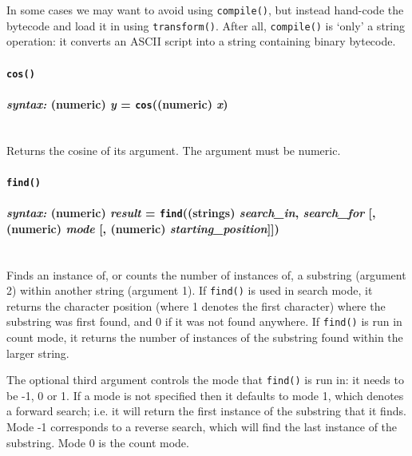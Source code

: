 \documentclass{article}
\begin{document}
In some cases we may want to avoid using \verb#compile()#, but instead hand-code the bytecode and load it in using \verb#transform()#.  After all, \texttt{compile()} is `only' a string operation:  it converts an ASCII script into a string containing binary bytecode.\\

 





\paragraph{\texttt{cos()}\\\\
\normalfont \emph{syntax: } (numeric) \emph{y} = \texttt{cos}((numeric) \emph{x})\\\\}

Returns the cosine of its argument.  The argument must be numeric.\\

 





\paragraph{\texttt{find()}\\\\
\normalfont \emph{syntax: } (numeric) \emph{result} = \texttt{find}((strings) \emph{search\_in}, \emph{search\_for} [, (numeric) \emph{mode} [, (numeric) \emph{starting\_position}]])\\\\}

Finds an instance of, or counts the number of instances of, a substring (argument 2) within another string (argument 1).  If \texttt{find()} is used in search mode, it returns the character position (where 1 denotes the first character) where the substring was first found, and 0 if it was not found anywhere.  If \texttt{find()} is run in count mode, it returns the number of instances of the substring found within the larger string.

The optional third argument controls the mode that \texttt{find()} is run in:  it needs to be -1, 0 or 1.  If a mode is not specified then it defaults to mode 1, which denotes a forward search; i.e. it will return the first instance of the substring that it finds.  Mode -1 corresponds to a reverse search, which will find the last instance of the substring.  Mode 0 is the count mode.
\end{document}
